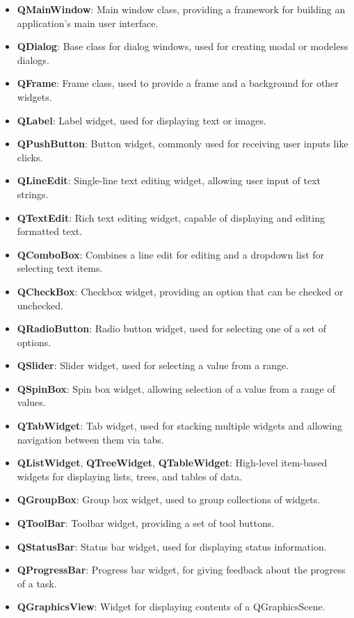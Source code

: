 \documentclass{report}
\begin{document}
    \pagebreak 
    \begin{itemize}
        \item \textbf{QMainWindow}: Main window class, providing a framework for building an application's main user interface.
        \item \textbf{QDialog}: Base class for dialog windows, used for creating modal or modeless dialogs.
        \item \textbf{QFrame}: Frame class, used to provide a frame and a background for other widgets.
        \item \textbf{QLabel}: Label widget, used for displaying text or images.
        \item \textbf{QPushButton}: Button widget, commonly used for receiving user inputs like clicks.
        \item \textbf{QLineEdit}: Single-line text editing widget, allowing user input of text strings.
        \item \textbf{QTextEdit}: Rich text editing widget, capable of displaying and editing formatted text.
        \item \textbf{QComboBox}: Combines a line edit for editing and a dropdown list for selecting text items.
        \item \textbf{QCheckBox}: Checkbox widget, providing an option that can be checked or unchecked.
        \item \textbf{QRadioButton}: Radio button widget, used for selecting one of a set of options.
        \item \textbf{QSlider}: Slider widget, used for selecting a value from a range.
        \item \textbf{QSpinBox}: Spin box widget, allowing selection of a value from a range of values.
        \item \textbf{QTabWidget}: Tab widget, used for stacking multiple widgets and allowing navigation between them via tabs.
        \item \textbf{QListWidget}, \textbf{QTreeWidget}, \textbf{QTableWidget}: High-level item-based widgets for displaying lists, trees, and tables of data.
        \item \textbf{QGroupBox}: Group box widget, used to group collections of widgets.
        \item \textbf{QToolBar}: Toolbar widget, providing a set of tool buttons.
        \item \textbf{QStatusBar}: Status bar widget, used for displaying status information.
        \item \textbf{QProgressBar}: Progress bar widget, for giving feedback about the progress of a task.
        \item \textbf{QGraphicsView}: Widget for displaying contents of a QGraphicsScene.
    \end{itemize}





    
\end{document}
